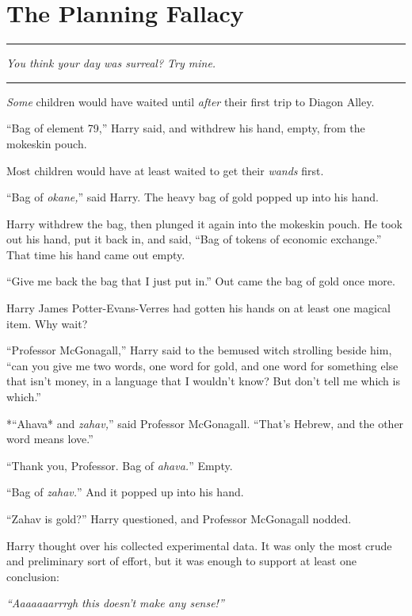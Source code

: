 \chapter{The Planning Fallacy}

\begin{center}\rule{3in}{0.4pt}\end{center}

\emph{You think your day was surreal? Try mine.}

\begin{center}\rule{3in}{0.4pt}\end{center}

\emph{Some} children would have waited until \emph{after} their first
trip to Diagon Alley.

``Bag of element 79,'' Harry said, and withdrew his hand, empty, from
the mokeskin pouch.

Most children would have at least waited to get their \emph{wands}
first.

``Bag of \emph{okane,}'' said Harry. The heavy bag of gold popped up
into his hand.

Harry withdrew the bag, then plunged it again into the mokeskin pouch.
He took out his hand, put it back in, and said, ``Bag of tokens of
economic exchange.'' That time his hand came out empty.

``Give me back the bag that I just put in.'' Out came the bag of gold
once more.

Harry James Potter-Evans-Verres had gotten his hands on at least one
magical item. Why wait?

``Professor McGonagall,'' Harry said to the bemused witch strolling
beside him, ``can you give me two words, one word for gold, and one word
for something else that isn't money, in a language that I wouldn't know?
But don't tell me which is which.''

*``Ahava* and \emph{zahav,}'' said Professor McGonagall. ``That's
Hebrew, and the other word means love.''

``Thank you, Professor. Bag of \emph{ahava.}'' Empty.

``Bag of \emph{zahav.}'' And it popped up into his hand.

``Zahav is gold?'' Harry questioned, and Professor McGonagall nodded.

Harry thought over his collected experimental data. It was only the most
crude and preliminary sort of effort, but it was enough to support at
least one conclusion:

\emph{``Aaaaaaarrrgh this doesn't make any sense!''}

